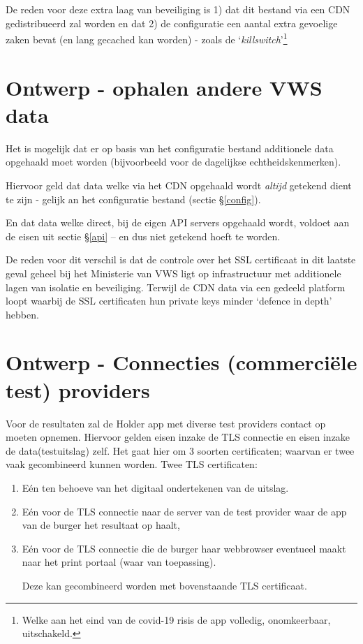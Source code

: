 \documentclass[11.0pt,twoside,openright]{report}
\begin{document}
De reden voor deze extra laag van beveiliging is 1) dat dit bestand via een CDN gedistribueerd zal worden en dat 2) de configuratie een aantal extra gevoelige zaken bevat (en lang gecached kan worden) - zoals de `\emph{killswitch}'\footnote{Welke aan het eind van de covid-19 risis de app volledig, onomkeerbaar, uitschakeld.}

\section{Ontwerp - ophalen andere VWS data}

Het is mogelijk dat er op basis van het configuratie bestand additionele data opgehaald moet worden (bijvoorbeeld voor de dagelijkse echtheidskenmerken).

Hiervoor geld dat data welke via het CDN opgehaald wordt \emph{altijd} getekend dient te zijn - gelijk an het configuratie bestand (sectie \S\ref{config}).

En dat data welke direct, bij de eigen API servers opgehaald wordt, voldoet aan de eisen uit sectie \S\ref{api} -- en dus niet getekend hoeft te worden.

De reden voor dit verschil is dat de controle over het SSL certificaat in dit laatste geval geheel bij het Ministerie van VWS ligt op infrastructuur met additionele lagen van isolatie en beveiliging. Terwijl de CDN data via een gedeeld platform loopt waarbij de SSL certificaten hun private keys minder `defence in depth' hebben.

\fi
\section{Ontwerp - Connecties (commerciële test) providers}

Voor de resultaten zal de Holder app met diverse test providers contact op moeten opnemen. Hiervoor gelden eisen inzake de TLS connectie en eisen inzake de data(testuitslag) zelf. Het gaat hier om 3 soorten certificaten; waarvan er twee vaak gecombineerd kunnen worden. Twee TLS certificaten:

\begin{enumerate}
\item Eén ten behoeve van het digitaal ondertekenen van de uitslag.
\item Eén voor de TLS connectie naar de server van de test provider waar de app van de burger het resultaat op haalt, 
\item Eén voor de TLS connectie die de burger haar webbrowser eventueel maakt naar het print portaal (waar van toepassing). 

Deze kan gecombineerd worden met bovenstaande TLS certificaat.
\end{enumerate}
\end{document}
